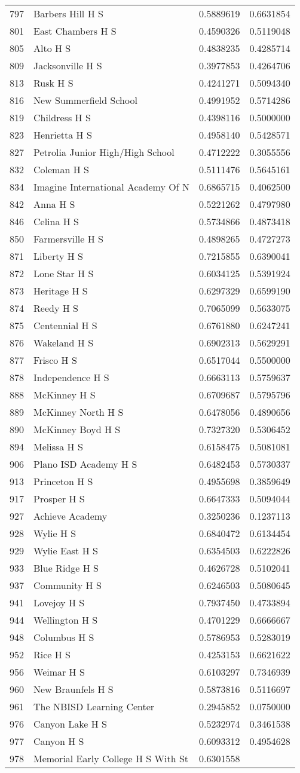 \documentclass[
]{article}
\begin{document}
\begin{longtable}[]{@{}llrr@{}}
797 & Barbers Hill H S & 0.5889619 & 0.6631854\tabularnewline
801 & East Chambers H S & 0.4590326 & 0.5119048\tabularnewline
805 & Alto H S & 0.4838235 & 0.4285714\tabularnewline
809 & Jacksonville H S & 0.3977853 & 0.4264706\tabularnewline
813 & Rusk H S & 0.4241271 & 0.5094340\tabularnewline
816 & New Summerfield School & 0.4991952 & 0.5714286\tabularnewline
819 & Childress H S & 0.4398116 & 0.5000000\tabularnewline
823 & Henrietta H S & 0.4958140 & 0.5428571\tabularnewline
827 & Petrolia Junior High/High School & 0.4712222 &
0.3055556\tabularnewline
832 & Coleman H S & 0.5111476 & 0.5645161\tabularnewline
834 & Imagine International Academy Of N & 0.6865715 &
0.4062500\tabularnewline
842 & Anna H S & 0.5221262 & 0.4797980\tabularnewline
846 & Celina H S & 0.5734866 & 0.4873418\tabularnewline
850 & Farmersville H S & 0.4898265 & 0.4727273\tabularnewline
871 & Liberty H S & 0.7215855 & 0.6390041\tabularnewline
872 & Lone Star H S & 0.6034125 & 0.5391924\tabularnewline
873 & Heritage H S & 0.6297329 & 0.6599190\tabularnewline
874 & Reedy H S & 0.7065099 & 0.5633075\tabularnewline
875 & Centennial H S & 0.6761880 & 0.6247241\tabularnewline
876 & Wakeland H S & 0.6902313 & 0.5629291\tabularnewline
877 & Frisco H S & 0.6517044 & 0.5500000\tabularnewline
878 & Independence H S & 0.6663113 & 0.5759637\tabularnewline
888 & McKinney H S & 0.6709687 & 0.5795796\tabularnewline
889 & McKinney North H S & 0.6478056 & 0.4890656\tabularnewline
890 & McKinney Boyd H S & 0.7327320 & 0.5306452\tabularnewline
894 & Melissa H S & 0.6158475 & 0.5081081\tabularnewline
906 & Plano ISD Academy H S & 0.6482453 & 0.5730337\tabularnewline
913 & Princeton H S & 0.4955698 & 0.3859649\tabularnewline
917 & Prosper H S & 0.6647333 & 0.5094044\tabularnewline
927 & Achieve Academy & 0.3250236 & 0.1237113\tabularnewline
928 & Wylie H S & 0.6840472 & 0.6134454\tabularnewline
929 & Wylie East H S & 0.6354503 & 0.6222826\tabularnewline
933 & Blue Ridge H S & 0.4626728 & 0.5102041\tabularnewline
937 & Community H S & 0.6246503 & 0.5080645\tabularnewline
941 & Lovejoy H S & 0.7937450 & 0.4733894\tabularnewline
944 & Wellington H S & 0.4701229 & 0.6666667\tabularnewline
948 & Columbus H S & 0.5786953 & 0.5283019\tabularnewline
952 & Rice H S & 0.4253153 & 0.6621622\tabularnewline
956 & Weimar H S & 0.6103297 & 0.7346939\tabularnewline
960 & New Braunfels H S & 0.5873816 & 0.5116697\tabularnewline
961 & The NBISD Learning Center & 0.2945852 & 0.0750000\tabularnewline
976 & Canyon Lake H S & 0.5232974 & 0.3461538\tabularnewline
977 & Canyon H S & 0.6093312 & 0.4954628\tabularnewline
978 & Memorial Early College H S With St & 0.6301558 &

\end{longtable}
\end{document}
